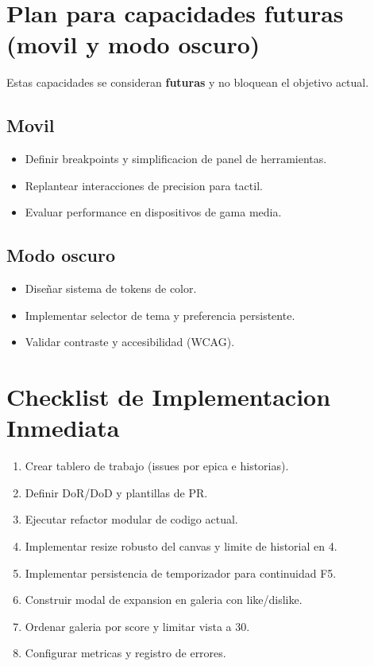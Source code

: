 \documentclass[12pt,a4paper]{article}
\begin{document}
\section{Plan para capacidades futuras (movil y modo oscuro)}
Estas capacidades se consideran \textbf{futuras} y no bloquean el objetivo actual.

\subsection{Movil}
\begin{itemize}
  \item Definir breakpoints y simplificacion de panel de herramientas.
  \item Replantear interacciones de precision para tactil.
  \item Evaluar performance en dispositivos de gama media.
\end{itemize}

\subsection{Modo oscuro}
\begin{itemize}
  \item Diseñar sistema de tokens de color.
  \item Implementar selector de tema y preferencia persistente.
  \item Validar contraste y accesibilidad (WCAG).
\end{itemize}

\section{Checklist de Implementacion Inmediata}
\begin{enumerate}
  \item Crear tablero de trabajo (issues por epica e historias).
  \item Definir DoR/DoD y plantillas de PR.
  \item Ejecutar refactor modular de codigo actual.
  \item Implementar resize robusto del canvas y limite de historial en 4.
  \item Implementar persistencia de temporizador para continuidad F5.
  \item Construir modal de expansion en galeria con like/dislike.
  \item Ordenar galeria por score y limitar vista a 30.
  \item Configurar metricas y registro de errores.
\end{enumerate}
\end{document}
